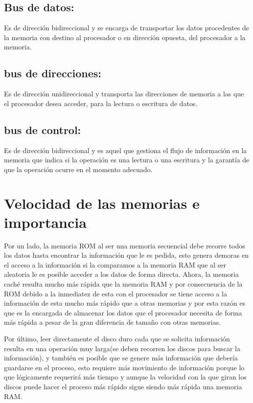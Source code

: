 \documentclass{article}
\begin{document}
\subsection{Bus de datos:}
Es de dirección bidireccional y se encarga de transportar los datos procedentes de la memoria con destino al procesador o en dirección opuesta, del procesador a la memoria.

\subsection{bus de direcciones:}
Es de dirección unidireccional y transporta las direcciones de memoria a las que el procesador desea acceder, para la lectura o escritura de datos.

\subsection{bus de control:}
Es de dirección bidireccional y es aquel que gestiona el flujo de información en la memoria que indica si la operación es una lectura o una escritura y la garantía de que la operación ocurre en el momento adecuado.

\section{Velocidad de las memorias e importancia}
Por un lado, la memoria ROM al ser una memoria secuencial debe recorre todos los datos hasta encontrar la información que le es pedida, esto genera demoras en el acceso a la información si la comparamos a la memoria RAM que al ser aleatoria le es posible acceder a los datos de forma directa. Ahora, la memoria caché resulta mucho más rápida que la memoria RAM y por consecuencia de la ROM debido a la inmediatez de esta con el procesador se tiene acceso a la información de esta mucho más rápido que a otras memorias y por esta razón es que es la encargada de almacenar los datos que el procesador necesita de forma más rápida a pesar de la gran diferencia de tamaño con otras memorias.\par
\vspace{5mm}
Por último, leer directamente el disco duro cada que se solicita información resulta en una operación muy larga(se deben recorren los discos para buscar la información), y también es posible que se genere más información que debería guardarse en el proceso, esto requiere más movimiento de información porque lo que lógicamente requerirá más tiempo y aunque la velocidad con la que giran los discos puede hacer el proceso más rápido sigue siendo más rápida una memoria RAM.
\end{document}
